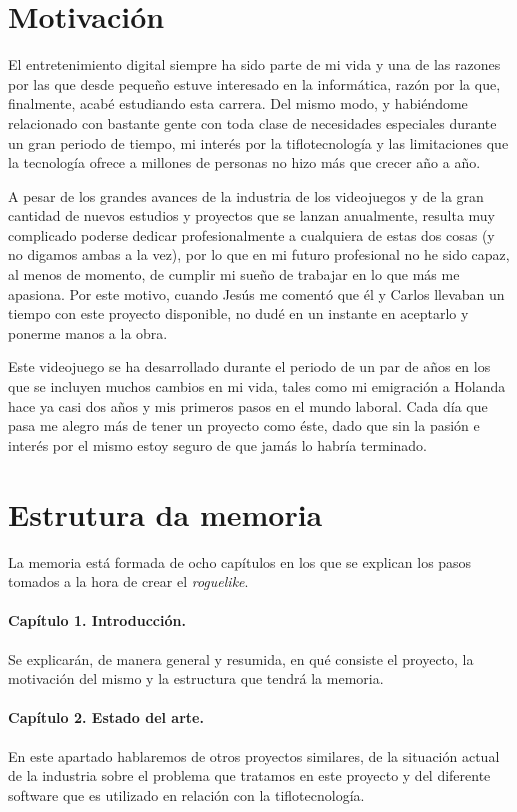 \section{Motivación}
El entretenimiento digital siempre ha sido parte de mi vida y una de las razones por las que desde pequeño estuve interesado en la informática, razón por la que, finalmente, acabé estudiando esta carrera. Del mismo modo, y habiéndome relacionado con bastante gente con toda clase de necesidades especiales durante un gran periodo de tiempo, mi interés por la tiflotecnología y las limitaciones que la tecnología ofrece a millones de personas no hizo más que crecer año a año.

A pesar de los grandes avances de la industria de los videojuegos y de la gran cantidad de nuevos estudios y proyectos que se lanzan anualmente, resulta muy complicado poderse dedicar profesionalmente a cualquiera de estas dos cosas (y no digamos ambas a la vez), por lo que en mi futuro profesional no he sido capaz, al menos de momento, de cumplir mi sueño de trabajar en lo que más me apasiona. Por este motivo, cuando Jesús me comentó que él y Carlos llevaban un tiempo con este proyecto disponible, no dudé en un instante en aceptarlo y ponerme manos a la obra.

Este videojuego se ha desarrollado durante el periodo de un par de años en los que se incluyen muchos cambios en mi vida, tales como mi emigración a Holanda hace ya casi dos años y mis primeros pasos en el mundo laboral. Cada día que pasa me alegro más de tener un proyecto como éste, dado que sin la pasión e interés por el mismo estoy seguro de que jamás lo habría terminado.

\section{Estrutura da memoria}

La memoria está formada de ocho capítulos en los que se explican los pasos tomados a la hora de crear el \textit{roguelike}.

\paragraph*{Capítulo 1. Introducción.}
Se explicarán, de manera general y resumida, en qué consiste el proyecto, la motivación del mismo y la estructura que tendrá la memoria.

\paragraph*{Capítulo 2. Estado del arte.}
En este apartado hablaremos de otros proyectos similares, de la situación actual de la industria sobre el problema que tratamos en este proyecto y del diferente software que es utilizado en relación con la tiflotecnología.

